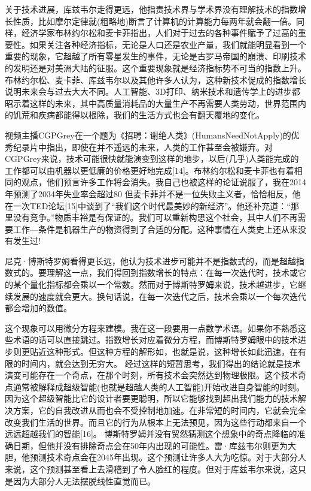 关于技术进展，库兹韦尔走得更远，他指责技术界与学术界没有理解技术的指数增长性质，比如摩尔定律就(粗略地)断言了计算机的计算能力每两年就会翻一倍。同样，经济学家布林约尔松和麦卡菲指出，人们对于过去的各种事件赋予了过高的重要性。如果关注各种经济指标，无论是人口还是农业产量，我们就能明显看到一个重要的现象，它超越了所有零星发生的事件，无论是古罗马帝国的崩溃、印刷技术的发明还是对美洲大陆的征服。这个重要现象就是经济指标势不可当的指数上升。
布林约尔松、麦卡菲、库兹韦尔以及其他许多人认为，这种新技术促成的指数增长说明未来会与过去大大不同。人工智能、3D打印、纳米技术和遗传学上的进步都昭示着这样的未来，其中高质量消耗品的大量生产不再需要人类劳动，世界范围内的饥荒和疾病都能得以根除，我们的生活方式也会有翻天覆地的变化。

视频主播CGPGrey在一个题为《招聘：谢绝人类》(HumansNeedNotApply)的优秀纪录片中指出，即使在并不遥远的未来，人类的工作甚至会被嫌弃。对CGPGrey来说，技术可能很快就能演变到这样的地步，以后(几乎)人类能完成的工作都可以由机器以更低廉的价格更好地完成[14]。布林约尔松和麦卡菲也有着相同的观点，他们预言许多工作将会消失。我自己也被这样的论证说服了，我在2014年预测了2034年失业率会超过80%
但麦卡菲并不是一位失败主义者，恰恰相反，他在一次TED论坛[15]中谈到了“我们这个时代最美妙的新经济”。他还补充道：“那里没有竞争。”物质丰裕是有保证的。我们可以重新构思这个社会，其中人们不再需要工作---条件是机器生产的物资得到了合适的分配。这种事情在人类史上还从来没有发生过!

尼克·博斯特罗姆看得更长远，他认为技术进步可能并不是指数式的，而是超越指数式的。要理解这一点，我们得回到指数增长的特点：在每一次迭代时，技术或它的某个量化指标都会乘以一个常数。然而对于博斯特罗姆来说，技术越进步，它继续发展的速度就会更大。换句话说，在每一次迭代之后，技术会乘以一个每次迭代都会增加的数值。

这个现象可以用微分方程来建模。我在这一段要用一点数学术语。如果你不熟悉这些术语的话可以直接跳过。指数增长对应着微分方程，而博斯特罗姆眼中的技术进步则更贴近这种形式。但这种方程的解形如，也就是说，这种增长如此迅速，在有限的时间内，就会达到无穷大。
经过这样的短暂思考，我们得出的结论就是技术演变可能存在一个奇点，在那个时刻，所有技术会突然达到物理极限。这个技术奇点通常被解释成超级智能(也就是超越人类的人工智能)开始改进自身智能的时刻。因为这个超级智能比它的设计者要更聪明，所以它能够找到超出我们能力的技术解决方案，它的自我改进从而也会不受控制地加速。在非常短的时间内，它就会完全改变我们生活的世界。而且它的行为从根本上无法预见，因为这些行动都来自一个远远超越我们的智能[16]。
博斯特罗姆并没有贸然猜测这个想象中的奇点降临的准确日期，但他并没有排除奇点会在50年内出现的可能性。雷·库兹韦尔则更为大胆，他预测技术奇点会在2045年出现。这个预测让许多人大为吃惊。对于大部分人来说，这个预测甚至看上去滑稽到了令人脸红的程度。但对于库兹韦尔来说，这只是因为大部分人无法摆脱线性直觉而已。



